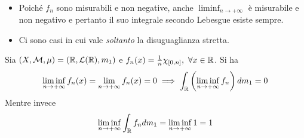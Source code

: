 \begin{observe}~{}
	\begin{itemize}
		\item Poiché $f_n$ sono misurabili e non negative, anche $\displaystyle\liminf_{n\to+\infty}$ è misurabile e non negativo e pertanto il suo integrale secondo Lebesgue esiste sempre. 
		\item Ci sono casi in cui vale \textit{soltanto} la disuguaglianza stretta.
	\end{itemize}
\end{observe}
\begin{examplewt}
	Sia $\left(X,\mathcal{M},\mu\right)=\left(\mathbb{R},\mathcal{L}(\mathbb{R}),m_1\right)$ e $f_n(x)=\frac{1}{n}\chi_{\left[0,n\right]},\ \forall x\in\realset$.	Si ha
	\begin{equation*}
		\liminf_{n\to+\infty}f_n(x)=\lim_{n\to+\infty}f_n(x)=0\\
		\implies\int_{\mathbb{R}}\left(\liminf_{n\to+\infty}f_n\right)dm_1=0
	\end{equation*}
	Mentre invece
	\begin{equation*}
		\liminf_{n\to+\infty}\int_{\mathbb{R}}f_ndm_1=\liminf_{n\to+\infty}1=1
	\end{equation*}
\end{examplewt}
